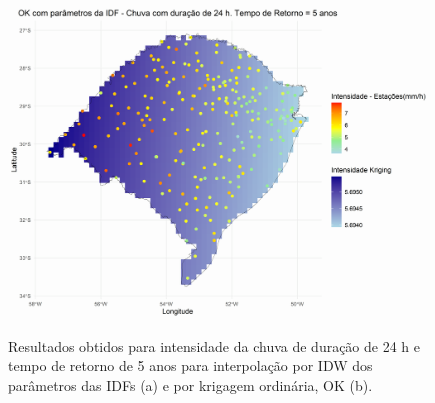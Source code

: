 \documentclass[
]{agujournal2019}
\begin{document}
\begin{figure}
\begin{minipage}{\linewidth}
{\includegraphics{Figuras/Figura32b.png}

}


\end{minipage}%

\caption{\label{fig-Figura32}Resultados obtidos para intensidade da
chuva de duração de 24 h e tempo de retorno de 5 anos para interpolação
por IDW dos parâmetros das IDFs (a) e por krigagem ordinária, OK (b).}

\end{figure}%
\end{document}
